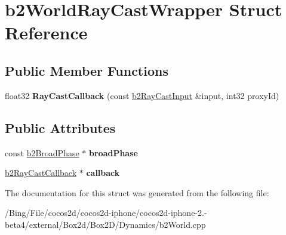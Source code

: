 \hypertarget{structb2_world_ray_cast_wrapper}{\section{b2\-World\-Ray\-Cast\-Wrapper Struct Reference}
\label{structb2_world_ray_cast_wrapper}
}
\subsection*{Public Member Functions}
\begin{DoxyCompactItemize}
\item 
\hypertarget{structb2_world_ray_cast_wrapper_a336aa5b664c3cfea61b0e28066f796d4}{float32 {\bfseries Ray\-Cast\-Callback} (const \hyperlink{structb2_ray_cast_input}{b2\-Ray\-Cast\-Input} \&input, int32 proxy\-Id)}\label{structb2_world_ray_cast_wrapper_a336aa5b664c3cfea61b0e28066f796d4}

\end{DoxyCompactItemize}
\subsection*{Public Attributes}
\begin{DoxyCompactItemize}
\item 
\hypertarget{structb2_world_ray_cast_wrapper_a8bf380db0756a568bec076e549544145}{const \hyperlink{classb2_broad_phase}{b2\-Broad\-Phase} $\ast$ {\bfseries broad\-Phase}}\label{structb2_world_ray_cast_wrapper_a8bf380db0756a568bec076e549544145}

\item 
\hypertarget{structb2_world_ray_cast_wrapper_a5e6d85af5ae2cda7a8da2306d6b86a3e}{\hyperlink{classb2_ray_cast_callback}{b2\-Ray\-Cast\-Callback} $\ast$ {\bfseries callback}}\label{structb2_world_ray_cast_wrapper_a5e6d85af5ae2cda7a8da2306d6b86a3e}

\end{DoxyCompactItemize}


The documentation for this struct was generated from the following file\-:\begin{DoxyCompactItemize}
\item 
/\-Bing/\-File/cocos2d/cocos2d-\/iphone/cocos2d-\/iphone-\/2.-\/beta4/external/\-Box2d/\-Box2\-D/\-Dynamics/b2\-World.\-cpp\end{DoxyCompactItemize}
